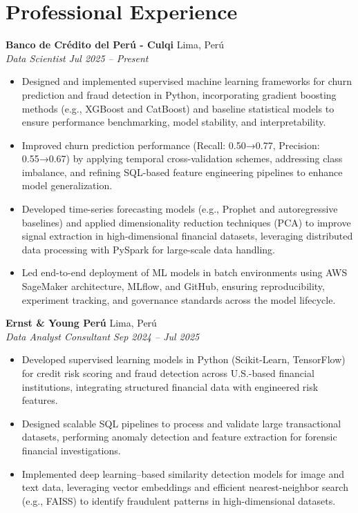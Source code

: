 \documentclass[9pt]{article}
\begin{document}
    \section*{Professional Experience}
    \vspace{3.5pt}
    
    \textbf{Banco de Crédito del Perú - Culqi} \hfill Lima, Perú \\
    \textit{Data Scientist} \hfill \textit{Jul 2025 -- Present}
    \vspace{-2pt}
    \begin{itemize}[leftmargin=1em, itemsep=1pt, topsep=2pt, parsep=0pt, partopsep=0pt]
    \item Designed and implemented supervised machine learning frameworks for churn prediction and fraud detection in Python, incorporating gradient boosting methods (e.g., XGBoost and CatBoost) and baseline statistical models to ensure performance benchmarking, model stability, and interpretability.
    \item Improved churn prediction performance (Recall: 0.50→0.77, Precision: 0.55→0.67) by applying temporal cross-validation schemes, addressing class imbalance, and refining SQL-based feature engineering pipelines to enhance model generalization.
    \item Developed time-series forecasting models (e.g., Prophet and autoregressive baselines) and applied dimensionality reduction techniques (PCA) to improve signal extraction in high-dimensional financial datasets, leveraging distributed data processing with PySpark for large-scale data handling.
    \item Led end-to-end deployment of ML models in batch environments using AWS SageMaker architecture, MLflow, and GitHub, ensuring reproducibility, experiment tracking, and governance standards across the model lifecycle.
    \end{itemize}
    \vspace{-2pt}
    \textbf{Ernst \& Young Perú} \hfill Lima, Perú \\
    \textit{Data Analyst Consultant} \hfill \textit{Sep 2024 -- Jul 2025}
    \vspace{-2pt}
    \begin{itemize}[leftmargin=1em, itemsep=1pt, topsep=2pt, parsep=0pt, partopsep=0pt]
    \item Developed supervised learning models in Python (Scikit-Learn, TensorFlow) for credit risk scoring and fraud detection across U.S.-based financial institutions, integrating structured financial data with engineered risk features.
    \item Designed scalable SQL pipelines to process and validate large transactional datasets, performing anomaly detection and feature extraction for forensic financial investigations.
    \item Implemented deep learning–based similarity detection models for image and text data, leveraging vector embeddings and efficient nearest-neighbor search (e.g., FAISS) to identify fraudulent patterns in high-dimensional datasets.
    \end{itemize}
\end{document}
